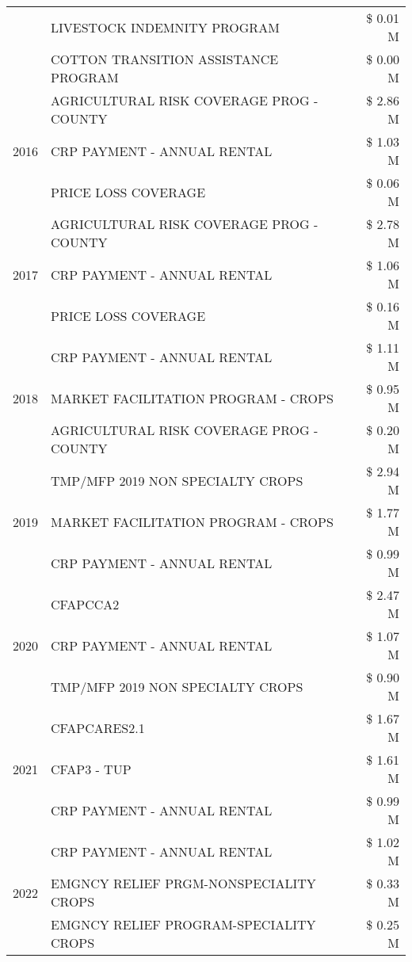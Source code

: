 \begin{tabular}{llr}
 & LIVESTOCK INDEMNITY PROGRAM & \$ 0.01 M \\
 & COTTON TRANSITION ASSISTANCE PROGRAM & \$ 0.00 M \\
\cline{1-3}
\multirow[t]{3}{*}{2016} & AGRICULTURAL RISK COVERAGE PROG - COUNTY & \$ 2.86 M \\
 & CRP PAYMENT - ANNUAL RENTAL & \$ 1.03 M \\
 & PRICE LOSS COVERAGE & \$ 0.06 M \\
\cline{1-3}
\multirow[t]{3}{*}{2017} & AGRICULTURAL RISK COVERAGE PROG - COUNTY & \$ 2.78 M \\
 & CRP PAYMENT - ANNUAL RENTAL & \$ 1.06 M \\
 & PRICE LOSS COVERAGE & \$ 0.16 M \\
\cline{1-3}
\multirow[t]{3}{*}{2018} & CRP PAYMENT - ANNUAL RENTAL & \$ 1.11 M \\
 & MARKET FACILITATION PROGRAM - CROPS & \$ 0.95 M \\
 & AGRICULTURAL RISK COVERAGE PROG - COUNTY & \$ 0.20 M \\
\cline{1-3}
\multirow[t]{3}{*}{2019} & TMP/MFP 2019 NON SPECIALTY CROPS & \$ 2.94 M \\
 & MARKET FACILITATION PROGRAM - CROPS & \$ 1.77 M \\
 & CRP PAYMENT - ANNUAL RENTAL & \$ 0.99 M \\
\cline{1-3}
\multirow[t]{3}{*}{2020} & CFAPCCA2 & \$ 2.47 M \\
 & CRP PAYMENT - ANNUAL RENTAL & \$ 1.07 M \\
 & TMP/MFP 2019 NON SPECIALTY CROPS & \$ 0.90 M \\
\cline{1-3}
\multirow[t]{3}{*}{2021} & CFAPCARES2.1 & \$ 1.67 M \\
 & CFAP3 - TUP & \$ 1.61 M \\
 & CRP PAYMENT - ANNUAL RENTAL & \$ 0.99 M \\
\cline{1-3}
\multirow[t]{3}{*}{2022} & CRP PAYMENT - ANNUAL RENTAL & \$ 1.02 M \\
 & EMGNCY RELIEF PRGM-NONSPECIALITY CROPS & \$ 0.33 M \\
 & EMGNCY RELIEF PROGRAM-SPECIALITY CROPS & \$ 0.25 M \\
\cline{1-3}
\bottomrule
\end{tabular}

